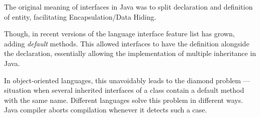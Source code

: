 The original meaning of interfaces in Java was to split declaration and definition of entity, facilitating Encapsulation/Data Hiding.

Though, in recent versions of the language interface feature list has grown, adding \emph{default} methods. This allowed interfaces to have the definition alongside the declaration, essentially allowing the implementation of multiple inheritance in Java.

In object-oriented languages, this unavoidably leads to the diamond problem \cite{sakkinen1989disciplined} --- situation when several inherited interfaces of a class contain a default method with the same name. Different languages solve this problem in different ways. Java compiler aborts compilation whenever it detects such a case.


